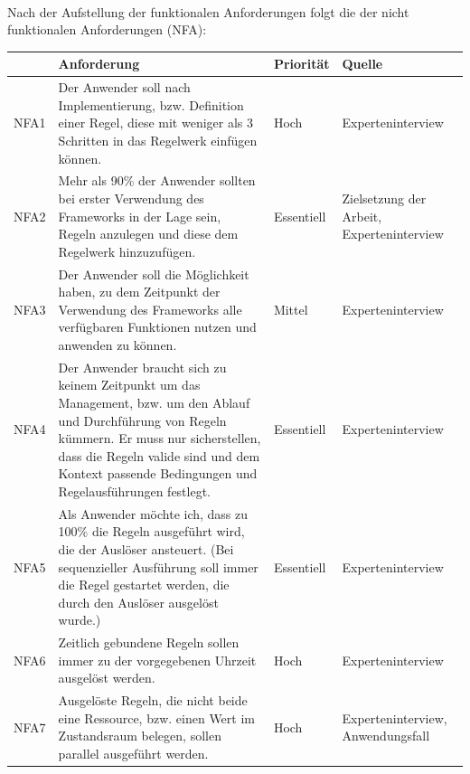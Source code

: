     \\
    Nach der Aufstellung der funktionalen Anforderungen folgt die der nicht funktionalen Anforderungen (NFA):
    \\
    \pagebreak
    \begin{table}[hbt!]
        \begin{center}
            \begin{tabular}{ | p{1.0cm} | p{9.2cm} | p{1.6cm} | p{3.1cm} | }
                \hline
                    \textbf{} & \textbf{Anforderung} & \textbf{Priorität} & \textbf{Quelle} \\
                \hline
                    NFA1 & Der Anwender soll nach Implementierung, bzw. Definition einer Regel, diese mit weniger als 3 Schritten in das Regelwerk einfügen können. & Hoch & Experteninterview \\
                \hline
                    NFA2 & Mehr als 90\% der Anwender sollten bei erster Verwendung des Frameworks in der Lage sein, Regeln anzulegen und diese dem Regelwerk hinzuzufügen. & Essentiell & Zielsetzung der Arbeit, Experteninterview \\ 
                \hline
                    NFA3 & Der Anwender soll die Möglichkeit haben, zu dem Zeitpunkt der Verwendung des Frameworks alle verfügbaren Funktionen nutzen und anwenden zu können. & Mittel & Experteninterview \\ 
                \hline
                    NFA4 & Der Anwender braucht sich zu keinem Zeitpunkt um das Management, bzw. um den Ablauf und Durchführung von Regeln kümmern. Er muss nur sicherstellen, dass die Regeln valide sind und dem Kontext passende Bedingungen und Regelausführungen festlegt. & Essentiell & Experteninterview \\ 
                \hline
                    NFA5 & Als Anwender möchte ich, dass zu 100\% die Regeln ausgeführt wird, die der Auslöser ansteuert. (Bei sequenzieller Ausführung soll immer die Regel gestartet werden, die durch den Auslöser ausgelöst wurde.) & Essentiell & Experteninterview \\
                \hline
                    NFA6 & Zeitlich gebundene Regeln sollen immer zu der vorgegebenen Uhrzeit ausgelöst werden. & Hoch & Experteninterview \\
                \hline
                    NFA7 & Ausgelöste Regeln, die nicht beide eine Ressource, bzw. einen Wert im Zustandsraum belegen, sollen parallel ausgeführt werden. & Hoch & Experteninterview, Anwendungsfall \\ 

\end{tabular}
\end{center}
\end{table}
